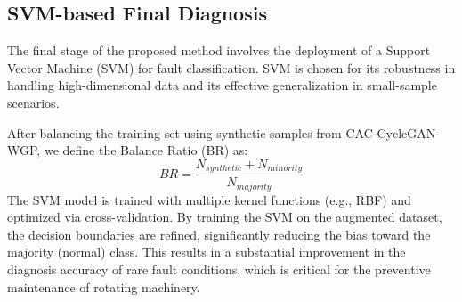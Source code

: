 \subsection{SVM-based Final Diagnosis}
The final stage of the proposed method involves the deployment of a Support Vector Machine (SVM) for fault classification. SVM is chosen for its robustness in handling high-dimensional data and its effective generalization in small-sample scenarios. 

After balancing the training set using synthetic samples from CAC-CycleGAN-WGP, we define the Balance Ratio (BR) as:
\begin{equation}
BR = \frac{N_{synthetic} + N_{minority}}{N_{majority}}
\end{equation}
The SVM model is trained with multiple kernel functions (e.g., RBF) and optimized via cross-validation. By training the SVM on the augmented dataset, the decision boundaries are refined, significantly reducing the bias toward the majority (normal) class. This results in a substantial improvement in the diagnosis accuracy of rare fault conditions, which is critical for the preventive maintenance of rotating machinery.
